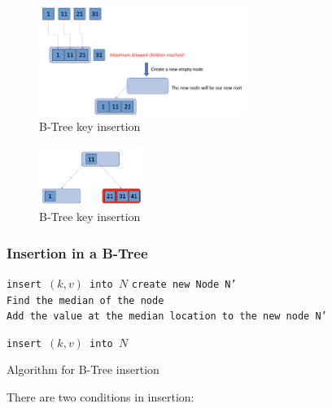 \begin{figure}[htp]
    \centering
    \includegraphics[width=0.6\textwidth]{graphs/B-Tree_example01.png}
    \caption{B-Tree key insertion}
    \label{fig:B-Tree key insertion1}
\end{figure}

\begin{figure}[htp]
    \centering
    \includegraphics[width=0.3\textwidth]{graphs/B-Tree_example02.png}
    \caption{B-Tree key insertion}
    \label{fig:B-Tree key insertion2}
\end{figure}

\subsubsection{Insertion in a B-Tree}

\begin{algorithm}[H]
    \SetAlgoLined
     {
        \texttt{insert $(k,v)$ into $N$}
     }
     {
        \texttt{create new Node N'}\\
        \texttt{Find the median of the node}\\
        \texttt{Add the value at the median location to the new node N'}\\
     }
    {
    
        \texttt{insert $(k,v)$ into $N$}
        
    }
     \caption{Algorithm for B-Tree insertion}
     \label{B-Tree Insertion}
\end{algorithm}

There are two conditions in insertion:


